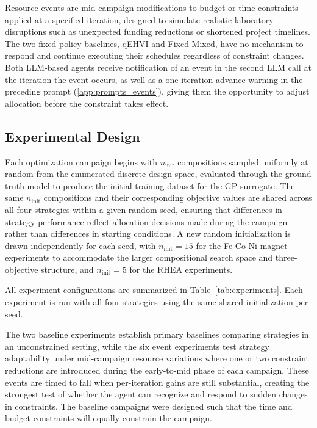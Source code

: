 Resource events are mid-campaign modifications to budget or time constraints applied at a specified iteration, designed to simulate realistic laboratory disruptions such as unexpected funding reductions or shortened project timelines. The two fixed-policy baselines, qEHVI and Fixed Mixed, have no mechanism to respond and continue executing their schedules regardless of constraint changes. Both LLM-based agents receive notification of an event in the second LLM call at the iteration the event occurs, as well as a one-iteration advance warning in the preceding prompt (\ref{app:prompts_events}), giving them the opportunity to adjust allocation before the constraint takes effect.
 
\subsection{Experimental Design}
\label{sec:experimental-design}

Each optimization campaign begins with $n_\mathrm{init}$ compositions sampled uniformly at random from the enumerated discrete design space, evaluated through the ground truth model to produce the initial training dataset for the GP surrogate. The same $n_\mathrm{init}$ compositions and their corresponding objective values are shared across all four strategies within a given random seed, ensuring that differences in strategy performance reflect allocation decisions made during the campaign rather than differences in starting conditions. A new random initialization is drawn independently for each seed, with $n_\mathrm{init} = 15$ for the Fe-Co-Ni magnet experiments to accommodate the larger compositional search space and three-objective structure, and $n_\mathrm{init} = 5$ for the RHEA experiments.

All experiment configurations are summarized in Table~\ref{tab:experiments}. Each experiment is run with all four strategies using the same shared initialization per seed.

The two baseline experiments establish primary baselines comparing strategies in an unconstrained setting, while the six event experiments test strategy adaptability under mid-campaign resource variations where one or two constraint reductions are introduced during the early-to-mid phase of each campaign. These events are timed to fall when per-iteration gains are still substantial, creating the strongest test of whether the agent can recognize and respond to sudden changes in constraints. The baseline campaigns were designed such that the time and budget constraints will equally constrain the campaign. 

